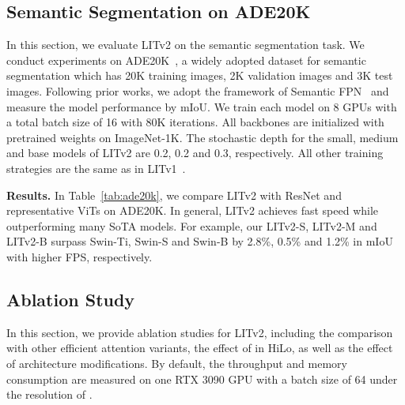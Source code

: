 \subsection{Semantic Segmentation on ADE20K}
In this section, we evaluate LITv2 on the semantic segmentation task. We conduct experiments on ADE20K~\cite{ade20k}, a widely adopted dataset for semantic segmentation which has 20K training images, 2K validation images and 3K test images. Following prior works, we adopt the framework of Semantic FPN~\cite{sem_fpn} and measure the model performance by mIoU.
We train each model on 8 GPUs with a total batch size of 16 with 80K iterations. All backbones are initialized with pretrained weights on ImageNet-1K. The stochastic depth for the small, medium and base models of LITv2 are 0.2, 0.2 and 0.3, respectively. All other training strategies are the same as in LITv1~\cite{lit}.

\textbf{Results.} In Table~\ref{tab:ade20k}, we compare LITv2 with ResNet and representative ViTs on ADE20K. In general, LITv2 achieves fast speed while outperforming many SoTA models. 
For example, our LITv2-S, LITv2-M and LITv2-B surpass Swin-Ti, Swin-S and Swin-B by 2.8\%, 0.5\% and 1.2\% in mIoU with higher FPS, respectively.

\subsection{Ablation Study} \label{sec:ablation}
In this section, we provide ablation studies for LITv2, including the comparison with other efficient attention variants, the effect of  in HiLo, as well as the effect of architecture modifications. By default, the throughput and memory consumption are measured on one RTX 3090 GPU with a batch size of 64 under the resolution of . 


